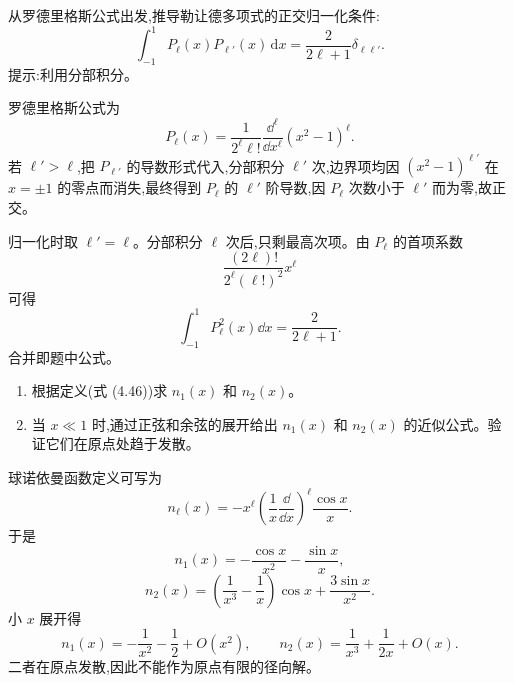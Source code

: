 \begin{question}
从罗德里格斯公式出发,推导勒让德多项式的正交归一化条件:
\[
\int_{-1}^{1}P_\ell(x)P_{\ell'}(x)\,\mathrm dx=\frac{2}{2\ell+1}\delta_{\ell\ell'}.
\]
提示:利用分部积分。
\begin{solution}

罗德里格斯公式为
\[
P_\ell(x)=\frac{1}{2^\ell\ell!}\frac{\dd^\ell}{\dd x^\ell}(x^2-1)^\ell.
\]
若 $\ell'>\ell$,把 $P_{\ell'}$ 的导数形式代入,分部积分 $\ell'$ 次,边界项均因 $(x^2-1)^{\ell'}$ 在 $x=\pm1$ 的零点而消失,最终得到 $P_\ell$ 的 $\ell'$ 阶导数,因 $P_\ell$ 次数小于 $\ell'$ 而为零,故正交。

归一化时取 $\ell'=
\ell$。分部积分 $\ell$ 次后,只剩最高次项。由 $P_\ell$ 的首项系数
\[
\frac{(2\ell)!}{2^\ell(\ell!)^2}x^\ell
\]
可得
\[
\int_{-1}^1P_\ell^2(x)\dd x=\frac{2}{2\ell+1}.
\]
合并即题中公式。

\end{solution}
\end{question}

\begin{question}
\begin{enumerate}
\item 根据定义(式 (4.46))求 $n_1(x)$ 和 $n_2(x)$。
\item 当 $x\ll1$ 时,通过正弦和余弦的展开给出 $n_1(x)$ 和 $n_2(x)$ 的近似公式。验证它们在原点处趋于发散。
\end{enumerate}

\par\smallskip
{}

\begin{solution}

球诺依曼函数定义可写为
\[
n_\ell(x)=-x^\ell\left(\frac{1}{x}\frac{\dd}{\dd x}\right)^\ell\frac{\cos x}{x}.
\]
于是
\[
n_1(x)=-\frac{\cos x}{x^2}-\frac{\sin x}{x},
\]
\[
n_2(x)=\left(\frac{1}{x^3}-\frac{1}{x}\right)\cos x+\frac{3\sin x}{x^2}.
\]
小 $x$ 展开得
\[
n_1(x)=-\frac1{x^2}-\frac12+O(x^2),
\qquad
n_2(x)=\frac{1}{x^3}+\frac{1}{2x}+O(x).
\]
二者在原点发散,因此不能作为原点有限的径向解。

\end{solution}
\end{question}

